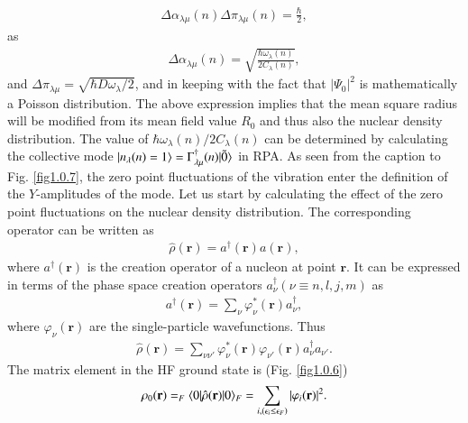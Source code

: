 \begin{align}\label{eq0.1.121}
\Delta\alpha_{\lambda\mu}{(n)}\Delta\pi_{\lambda\mu}{(n)}=\frac{\hbar}{2},
\end{align}
as
\begin{align}\label{eq1.8.2}
\Delta\alpha_{\lambda\mu}{(n)}=\sqrt{\frac{\hbar\omega_\lambda(n)}{2C_\lambda(n)}},
\end{align}
and $\Delta\pi_{\lambda\mu}=\sqrt{\hbar D\omega_\lambda/2}$, and in keeping with the fact that $|\Psi_0|^2$ is mathematically a Poisson distribution. The above expression implies that the mean square radius will be modified from its mean field value $R_0$  and thus also the nuclear density distribution. The value of $\hbar\omega_\lambda(n)/2C_\lambda(n)$ can be determined by calculating the collective mode $|{n_\lambda(n)=1} \rangle=\Gamma_{\lambda\mu}^\dagger(n)|{\tilde 0} \rangle$ in RPA. As seen from the caption to Fig. \ref{fig1.0.7}, the zero point fluctuations of the vibration enter the definition of the $Y$-amplitudes of the mode. Let us start by calculating the effect of the zero point fluctuations on the nuclear density distribution. The corresponding operator can be written as
\begin{align}\label{eq0.1.123}
\hat\rho(\mathbf r)=a^\dagger(\mathbf r)a(\mathbf r),
\end{align}
where $a^\dagger(\mathbf r)$ is the creation operator of a nucleon at point $\mathbf r$. It can be expressed in terms of the phase space creation operators $a^\dagger_\nu(\nu\equiv n,l,j,m)$ as
\begin{align}\label{eq0.1.124}
a^\dagger(\mathbf r)=\sum_\nu\varphi^*_\nu(\mathbf r) a^\dagger_\nu,
\end{align}
where $\varphi_\nu(\mathbf r)$ are the single-particle wavefunctions. Thus
\begin{align}\label{eq0.1.125}
\hat\rho(\mathbf r)=\sum_{\nu\nu'}\varphi^*_\nu(\mathbf r)\varphi_{\nu'}(\mathbf r)a^\dagger_\nu a_{\nu'}.
\end{align}
The matrix element in the HF ground state is (Fig. \ref{fig1.0.6})
\begin{align}\label{eq0.1.126}
\rho_0(\mathbf r)=_F\langle {0|\hat\rho(\mathbf r)|0} \rangle_F=\sum_{i, (\epsilon_i\leq\epsilon_F)}|\varphi_i(\mathbf r)|^2.
\end{align}
